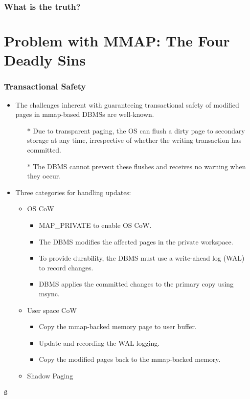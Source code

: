 \documentclass[slidestop,mathsrif]{beamer}
\begin{document}
\begin{frame}
	 \frametitle{What is the truth?}
	\begin{center}
		 \fontsize{20pt}{\baselineskip}
	\end{center}
	
\end{frame}

\section{Problem with MMAP: The Four Deadly Sins}
\begin{frame}
	\frametitle{Transactional Safety}
	\begin{itemize}
		\item The challenges inherent with guaranteeing transactional safety of modified pages in mmap-based DBMSs are well-known.
		\begin{itemize}
			\item[$\ast$] Due to transparent paging, {\color{red}the OS can flush a dirty page} to secondary storage {\color{red}at any time}, irrespective of whether the writing transaction has committed. 
			\item[$\ast$] The DBMS cannot prevent these flushes and receives {\color{red}no warning} when they occur.
		\end{itemize}
	\end{itemize}
	\begin{itemize}
		\item Three categories for handling updates:
		\begin{itemize}
			\item<1->[$\ast$] OS CoW
			\begin{itemize}
				\item<2->[\checkmark] MAP\_PRIVATE to enable OS CoW.
				\item<3->[\checkmark]The DBMS modifies the affected pages in the private workspace.
				\item<4->[\checkmark] To provide durability, the DBMS must use a write-ahead log (WAL) to record changes.
				\item<5->[\checkmark] DBMS applies the committed changes to the primary copy using msync.
			\end{itemize}
			\item<6->[$\ast$]  User space CoW
			\begin{itemize}
				\item<7->[\checkmark] Copy the mmap-backed memory page to user buffer.
				\item<8->[\checkmark] Update and recording the WAL logging.
				\item<9->[\checkmark] Copy the modified pages back to the mmap-backed memory.
			\end{itemize}
			\item<10->[$\ast$]  Shadow Paging
		\end{itemize}
	\end{itemize}ß
\end{frame}
\end{document}
